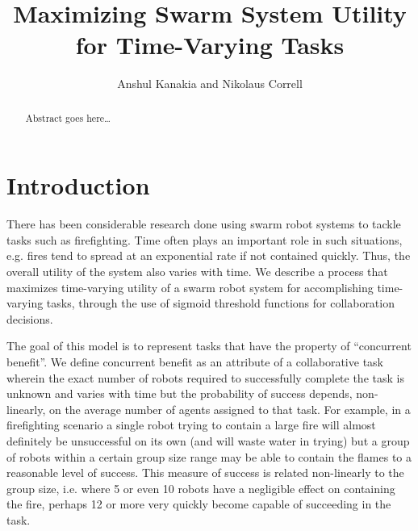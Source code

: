 \documentclass{sage}
\begin{document}
\title{Maximizing Swarm System Utility for Time-Varying Tasks}
\author{Anshul Kanakia and Nikolaus Correll}
\address{Department of Computer Science,
	University of Colorado, Boulder, USA}

\maketitle

\begin{abstract}
Abstract goes here\ldots
\end{abstract}

\section{Introduction}
There has been considerable research done using swarm robot systems to tackle tasks  such as firefighting. Time often plays an important role in such situations, e.g. fires tend to spread at an exponential rate if not contained quickly. Thus, the overall utility of the system also varies with time. We describe a process that maximizes time-varying utility of a swarm robot system for accomplishing time-varying tasks, through the use of sigmoid threshold functions for collaboration decisions.

The goal of this model is to represent tasks that have the property of ``concurrent benefit''. We define concurrent benefit as an attribute of a collaborative task wherein the exact number of robots required to successfully complete the task is unknown and varies with time but the probability of success depends, non-linearly, on the average number of agents assigned to that task. For example, in a firefighting scenario a single robot trying to contain a large fire will almost definitely be unsuccessful on its own (and will waste water in trying) but a group of robots within a certain group size range may be able to contain the flames to a reasonable level of success. This measure of success is related non-linearly to the group size, i.e. where 5 or even 10 robots have a negligible effect on containing the fire, perhaps 12 or more very quickly become capable of succeeding in the task.
\end{document}

